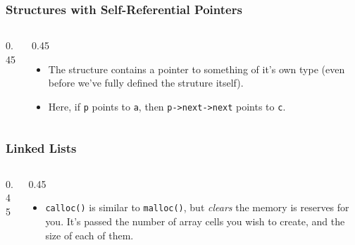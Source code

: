 
\begin{frame}[fragile]
\frametitle{Structures with Self-Referential Pointers}
\begin{columns}[T]

\begin{column}{0.45\textwidth}

\end{column}

\pause
\begin{column}{0.45\textwidth}
\begin{itemize}[<+->]
\item The structure contains a pointer to something of it's own type (even before we've fully defined the struture itself).
\item Here, if \verb^p^ points to \verb^a^, then \verb^p->next->next^ points to \verb^c^.
\end{itemize}
\end{column}

\end{columns}
\end{frame}



\begin{frame}[fragile]
\frametitle{Linked Lists}
\begin{columns}[T]

\begin{column}{0.45\textwidth}

\end{column}

\pause
\begin{column}{0.45\textwidth}

\begin{itemize}[<+->]
\item \verb^calloc()^ is similar to \verb^malloc()^, but {\em clears} the memory is reserves for you. It's passed the number of array cells you wish to create, and the size of each of them.
\end{itemize}
\end{column}

\end{columns}
\end{frame}


